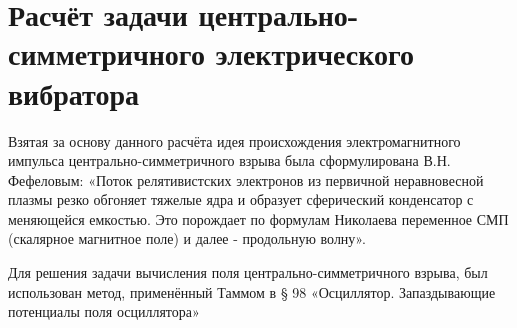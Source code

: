 \documentclass[11pt]{article}
\begin{document}
\section*{Расчёт задачи центрально-симметричного электрического вибратора}

Взятая за основу данного расчёта идея происхождения электромагнитного импульса
центрально-симметричного взрыва была сформулирована В.Н. Фефеловым:
«Поток релятивистских электронов из первичной неравновесной плазмы резко
обгоняет тяжелые ядра и образует сферический конденсатор с меняющейся
емкостью. Это порождает по формулам Николаева переменное СМП (скалярное
магнитное поле) и далее - продольную волну».

Для решения задачи вычисления поля центрально-симметричного взрыва, был использован метод,
применённый Таммом в § 98 «Осциллятор. Запаздывающие потенциалы поля
осциллятора» \cite{Tamm1957}
\end{document}

